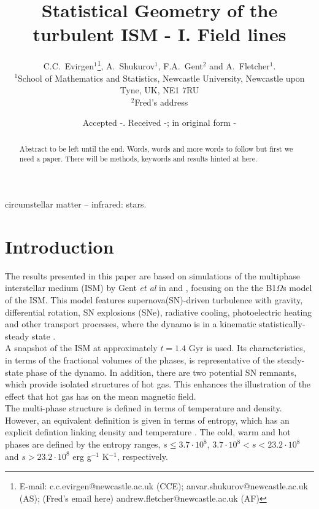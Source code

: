 \documentclass[useAMS,usenatbib]{mn2e}
\title[Statistical Geometry of the turbulent multi-phase ISM - I. Field lines]{Statistical Geometry of the turbulent ISM - I. Field lines}
\author[C. C.~Evirgen, A.~Shukurov, F.A. Gent and A.~Fletcher]{C.C.~Evirgen$^{1}$\thanks{E-mail:
c.c.evirgen@newcastle.ac.uk (CCE); anvar.shukurov@newcastle.ac.uk (AS); (Fred's email here) andrew.fletcher@newcastle.ac.uk (AF)}, A.~Shukurov$^{1}$, F.A.~Gent$^{2}$ and A.~Fletcher$^{1}$.\\%
$^{1}$School of Mathematics and Statistics, Newcastle University,
Newcastle upon Tyne, UK, NE1 7RU\\$^{2}$Fred's address}
\begin{document}
\newcommand{\bvec}[1]{\boldsymbol{#1}}
\newcommand{\avg}[1]{\left<\bvec{#1}\right>_{l}}
\date{Accepted -. Received -; in original form -}

\pagerange{\pageref{firstpage}--\pageref{lastpage}} 

\maketitle

\label{firstpage}

\begin{abstract}
Abstract to be left until the end. Words, words and more words to follow but first we need a paper. There will be methods, keywords and results hinted at here. 
\end{abstract}

\begin{keywords}
circumstellar matter -- infrared: stars.
\end{keywords}

\section{Introduction}
The results presented in this paper are based on simulations of the multiphase interstellar medium (ISM) by Gent \textsl{et al} in \citep{gent1} and \citep{gent2}, %
focusing on the the B1$\Omega$s model of the ISM. This model features supernova(SN)-driven turbulence with gravity, differential rotation, SN explosions (SNe), radiative cooling, photoelectric heating and other transport processes, where the dynamo is in a kinematic statistically-steady state \citep{gent1,gent2}.\\
A snapshot of the ISM at approximately $t=1.4$ Gyr is used. Its characteristics, in terms of the fractional volumes of the phases, is representative of the steady-state phase of the dynamo. In addition, there are two potential SN remnants, which provide isolated structures of hot gas. This enhances the illustration of the effect that hot gas has on the mean magnetic field. \\
The multi-phase structure is defined in terms of temperature and density. However, an equivalent definition is given in terms of entropy, which has an explicit defintion linking density and temperature \citep{gentphd}. The cold, warm and hot phases are defined by the entropy ranges, $s\leq3.7\cdot10^8$, $3.7\cdot10^8<s<23.2\cdot10^8$ and $s>23.2\cdot10^8$ erg g$^{-1}$ K$^{-1}$, respectively. 
\end{document}
